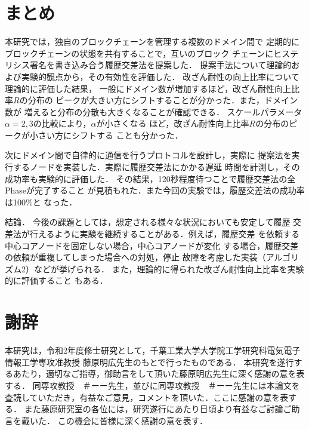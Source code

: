 \documentclass[a4paper,12pt]{jsarticle}
\begin{document}
\section{まとめ}
本研究では，独自のブロックチェーンを管理する複数のドメイン間で
定期的にブロックチェーンの状態を共有することで，互いのブロック
チェーンにヒステリシス署名を書き込み合う履歴交差法を提案した．
提案手法について理論的および実験的観点から，その有効性を評価した．
改ざん耐性の向上比率について理論的に評価した結果，
一般にドメイン数が増加するほど，改ざん耐性向上比率$R$の分布の
ピークが大きい方にシフトすることが分かった．また，ドメイン数が
増えると分布の分散も大きくなることが確認できる．
スケールパラメータ$\alpha=2,3$の比較により，$\alpha$が小さくなる
ほど，改ざん耐性向上比率$R$の分布のピークが小さい方にシフトする
ことも分かった．

次にドメイン間で自律的に通信を行うプロトコルを設計し，実際に
提案法を実行するノードを実装した．実際に履歴交差法にかかる遅延
時間を計測し，その成功率も実験的に評価した．
その結果，120秒程度待つことで履歴交差法の全Phaseが完了すること
が見積もれた．また今回の実験では，履歴交差法の成功率は100\%と
なった．




結論．
今後の課題としては，想定される様々な状況においても安定して履歴
交差法が行えるように実験を継続することがある．例えば，履歴交差
を依頼する中心コアノードを固定しない場合，中心コアノードが変化
する場合，履歴交差の依頼が重複してしまった場合への対処，停止
故障を考慮した実装（アルゴリズム2）などが挙げられる．
また，理論的に得られた改ざん耐性向上比率を実験的に評価すること
もある．




\newpage
\section*{謝辞}

本研究は，令和2年度修士研究として，千葉工業大学大学院工学研究科電気電子情報工学専攻准教授 藤原明広先生のもとで行ったものである．
本研究を遂行するあたり，適切なご指導，御助言をして頂いた藤原明広先生に深く感謝の意を表する．
同専攻教授　＃ーー先生，並びに同専攻教授　＃ーー先生には本論文を査読していただき，有益なご意見，コメントを頂いた．ここに感謝の意を表する．
また藤原研究室の各位には，研究遂行にあたり日頃より有益なご討論ご助言を戴いた．
この機会に皆様に深く感謝の意を表す．
\end{document}
